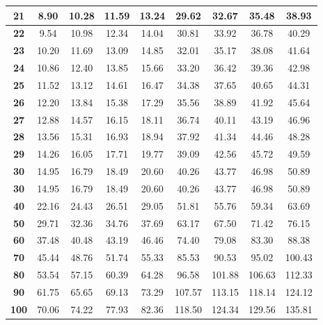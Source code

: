 \begin{tabular}{*{9}{|c}|}
\hline 
\textbf{21} & 8.90 &10.28 &11.59 &13.24 &29.62 &32.67 &35.48 &38.93 \\
\hline 
\textbf{22} & 9.54 &10.98 &12.34 &14.04 &30.81 &33.92 &36.78 &40.29 \\
\hline 
\textbf{23} & 10.20 &11.69 &13.09 &14.85 &32.01 &35.17 &38.08 &41.64 \\
\hline 
\textbf{24} & 10.86 &12.40 &13.85 &15.66 &33.20 &36.42 &39.36 &42.98 \\
\hline 
\textbf{25} & 11.52 &13.12 &14.61 &16.47 &34.38 &37.65 &40.65 &44.31 \\
\hline 
\textbf{26} & 12.20 &13.84 &15.38 &17.29 &35.56 &38.89 &41.92 &45.64 \\
\hline 
\textbf{27} & 12.88 &14.57 &16.15 &18.11 &36.74 &40.11 &43.19 &46.96 \\
\hline 
\textbf{28} & 13.56 &15.31 &16.93 &18.94 &37.92 &41.34 &44.46 &48.28 \\
\hline 
\textbf{29} & 14.26 &16.05 &17.71 &19.77 &39.09 &42.56 &45.72 &49.59 \\
\hline 
\textbf{30} & 14.95 &16.79 &18.49 &20.60 &40.26 &43.77 &46.98 &50.89 \\
\hline 
\textbf{30} & 14.95 &16.79 &18.49 &20.60 &40.26 &43.77 &46.98 &50.89 \\
\hline 
\textbf{40} & 22.16 &24.43 &26.51 &29.05 &51.81 &55.76 &59.34 &63.69 \\
\hline 
\textbf{50} & 29.71 &32.36 &34.76 &37.69 &63.17 &67.50 &71.42 &76.15 \\
\hline 
\textbf{60} & 37.48 &40.48 &43.19 &46.46 &74.40 &79.08 &83.30 &88.38 \\
\hline 
\textbf{70} & 45.44 &48.76 &51.74 &55.33 &85.53 &90.53 &95.02 &100.43 \\
\hline 
\textbf{80} & 53.54 &57.15 &60.39 &64.28 &96.58 &101.88 &106.63 &112.33 \\
\hline 
\textbf{90} & 61.75 &65.65 &69.13 &73.29 &107.57 &113.15 &118.14 &124.12 \\
\hline 
\textbf{100} & 70.06 &74.22 &77.93 &82.36 &118.50 &124.34 &129.56 &135.81 \\
\hline 
\end{tabular}